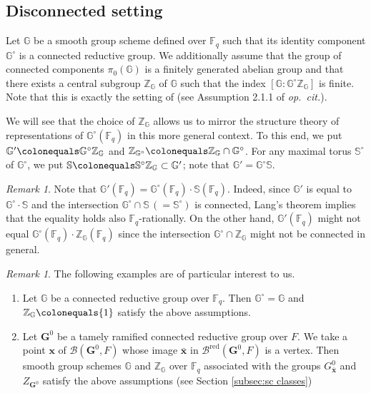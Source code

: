 \documentclass{amsart}
\newcommand{\red}{\mathrm{red}}
\newcommand{\x}{\mathbf{x}}
\newcommand{\F}{\mathbb{F}}
\newcommand{\FF}{\mathbb{F}}
\newcommand{\bbS}{\mathbb{S}}
\newcommand{\bbG}{\mathbb{G}}
\newcommand{\bfG}{\mathbf{G}}
\newcommand{\bbZ}{\mathbb{Z}}
\newcommand{\mcB}{\mathcal{B}}
\theoremstyle{plain}
\theoremstyle{definition}
\theoremstyle{remark}
\newtheorem{rem}[thm]{Remark}
\theoremstyle{theorem}
\begin{document}
\subsection{Disconnected setting}\label{subsec:disconn}

Let $\bbG$ be a smooth group scheme defined over $\F_q$ such that its identity component $\bbG^\circ$ is a connected reductive group.
We additionally assume that the group of connected components $\pi_0(\bbG)$ is a finitely generated abelian group and that there exists a central subgroup $\bbZ_\bbG$ of $\bbG$ such that the index $[\bbG : \bbG^\circ \bbZ_{\bbG}]$ is finite. Note that this is exactly the setting of \cite[Section 2.1]{Kal19-sc} (see Assumption 2.1.1 of \textit{op.\ cit.}).

We will see that the choice of $\bbZ_\bbG$ allows us to mirror the structure theory of representations of $\bbG^\circ(\FF_q)$ in this more general context. To this end, we put $\bbG' \colonequals \bbG^\circ \bbZ_\bbG$ and $\bbZ_{\bbG^\circ} \colonequals \bbZ_\bbG \cap \bbG^\circ$. For any maximal torus $\bbS^\circ$ of $\bbG^\circ$, we put $\bbS \colonequals \bbS^\circ \bbZ_\bbG \subset \bbG'$; note that $\bbG' = \bbG^\circ \bbS$.

\begin{rem}\label{rem:rational-pts}
Note that $\bbG'(\F_{q})=\bbG^{\circ}(\F_{q})\cdot\bbS(\F_{q})$.
Indeed, since $\bbG'$ is equal to $\bbG^{\circ}\cdot\bbS$ and the intersection $\bbG^{\circ}\cap\bbS\,(=\bbS^{\circ})$ is connected, Lang's theorem implies that the equality holds also $\F_{q}$-rationally.
On the other hand, $\bbG'(\F_{q})$ might not equal $\bbG^{\circ}(\F_{q})\cdot\bbZ_{\bbG}(\F_{q})$ since the intersection $\bbG^{\circ}\cap\bbZ_{\bbG}$ might not be connected in general.
\end{rem}

\begin{rem}\label{rem:examples}
The following examples are of particular interest to us.
\begin{enumerate}
\item
Let $\bbG$ be a connected reductive group over $\F_{q}$.
Then $\bbG^{\circ}=\bbG$ and $\bbZ_{\bbG}\colonequals \{1\}$ satisfy the above assumptions.
\item
Let $\bfG^{0}$ be a tamely ramified connected reductive group over $F$.
We take a point $\x$ of $\mcB(\bfG^{0},F)$ whose image $\bar{\x}$ in $\mcB^{\red}(\bfG^{0},F)$ is a vertex.
Then smooth group schemes $\bbG$ and $\bbZ_{\bbG}$ over $\F_{q}$ associated with the groups $G^{0}_{\bar{\x}}$ and $Z_{\bfG^{0}}$ satisfy the above assumptions (see Section \ref{subsec:sc classes})
\end{enumerate}
\end{rem}
\end{document}
